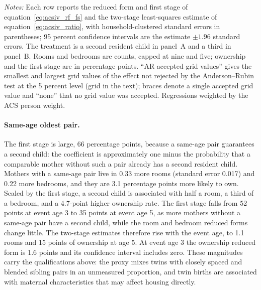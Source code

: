\begin{table}[htbp]
\centering
\footnotesize
\caption{Pooled estimates, event ages 0--5}
\label{tab:acsiv_pooled}

\par\medskip
\begin{minipage}{0.97\linewidth}
\footnotesize\textit{Notes:} Each row reports the reduced form and first stage of
equation~\eqref{eq:acsiv_rf_fs} and the two-stage least-squares estimate of
equation~\eqref{eq:acsiv_ratio}, with household-clustered standard errors in
parentheses; 95 percent confidence intervals are the estimate $\pm1.96$ standard
errors. The treatment is a second resident child in panel~A and a third in
panel~B. Rooms and bedrooms are counts, capped at nine and five; ownership and the
first stage are in percentage points. ``AR accepted grid values'' gives the
smallest and largest grid values of the effect not rejected by the Anderson--Rubin
test at the 5 percent level (grid in the text); braces denote a single accepted grid
value and ``none'' that no grid value was accepted. Regressions weighted by the ACS
person weight.
\end{minipage}
\end{table}

\paragraph{Same-age oldest pair.}
The first stage is large, 66 percentage points, because a same-age pair guarantees
a second child: the coefficient is approximately one minus the probability that a
comparable mother without such a pair already has a second resident child. Mothers
with a same-age pair live in 0.33 more rooms (standard error 0.017) and 0.22 more
bedrooms, and they are 3.1 percentage points more likely to own. Scaled by the first
stage, a second child is associated with half a room, a third of a bedroom, and a
4.7-point higher ownership rate. The first stage falls from 52 points at event age
3 to 35 points at event age 5, as more mothers without a same-age pair have a second
child, while the room and bedroom reduced forms change little. The two-stage
estimates therefore rise with the event age, to 1.1 rooms and 15 points of
ownership at age 5. At event age 3 the ownership reduced form is 1.6 points and its
confidence interval includes zero. These magnitudes carry the qualifications
above: the proxy mixes twins with closely spaced and blended sibling pairs in an
unmeasured proportion, and twin births are associated with maternal
characteristics that may affect housing directly.

